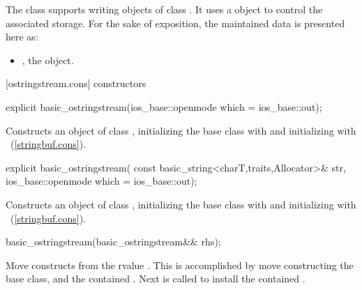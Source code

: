 \pnum
The class
supports writing objects of class
.
It uses a
object to control the associated storage.
For the sake of exposition, the maintained data is presented here as:
\begin{itemize}
\item
{}, the  object.
\end{itemize}

[ostringstream.cons]{ constructors}

%
\begin{itemdecl}
explicit basic_ostringstream(ios_base::openmode which = ios_base::out);
\end{itemdecl}

\begin{itemdescr}
\pnum
\effects
Constructs an object of class
,
initializing the base class with
and initializing  with
~(\ref{stringbuf.cons}).
\end{itemdescr}

%
\begin{itemdecl}
explicit basic_ostringstream(
  const basic_string<charT,traits,Allocator>& str,
  ios_base::openmode which = ios_base::out);
\end{itemdecl}

\begin{itemdescr}
\pnum
\effects
Constructs an object of class
,
initializing the base class with
and initializing  with
~(\ref{stringbuf.cons}).
\end{itemdescr}

%
\begin{itemdecl}
basic_ostringstream(basic_ostringstream&& rhs);
\end{itemdecl}

\begin{itemdescr}
\pnum
\effects Move constructs from the rvalue . This
is accomplished by move constructing the base class, and the contained
.
Next  is called to
install the contained .
\end{itemdescr}

